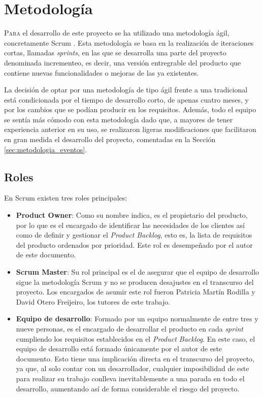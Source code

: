 \chapter{Metodología}
\label{chap:metodologia}

\lettrine{P}{ara} el desarrollo de este proyecto se ha utilizado una metodología ágil, concretamente Scrum \cite{scrum}.
Esta metodología se basa en la realización de iteraciones cortas, llamadas \textit{sprints}, en las que se desarrolla una parte del proyecto
denominada incrementeo, es decir, una versión entregrable del producto que contiene
nuevas funcionalidades o mejoras de las ya existentes.

\bigskip
La decisión de optar por una metodología de tipo ágil frente a una tradicional
está condicionada por el tiempo de desarrollo corto, de apenas cuatro meses, y por los cambios que se podían producir en los requisitos.
Además, todo el equipo se sentía más cómodo con esta metodología dado que, a mayores de tener experiencia anterior en su uso, se realizaron
ligeras modificaciones que facilitaron en gran medida el desarrollo del proyecto, comentadas en la Sección \ref{sec:metodologia_eventos}.

\section{Roles}
\label{sec:metodologia_roles}

En Scrum existen tres roles principales:

\begin{itemize}
	\item \textbf{Product Owner}: Como su nombre indica, es el propietario del producto, por lo que es el encargado de identificar
	      las necesidades de los clientes así como de definir y gestionar el \textit{Product Backlog}, esto es, la lista de requisitos del producto ordenados por prioridad.
	      Este rol es desempeñado por el autor de este documento.
	\item \textbf{Scrum Master}: Su rol principal es el de asegurar que el equipo de desarrollo sigue la metodología Scrum y no se producen
	      desajustes en el transcurso del proyecto. Los encargados de asumir este rol fueron Patricia Martín Rodilla y David Otero Freijeiro, los
	      tutores de este trabajo.
	\item \textbf{Equipo de desarrollo}: Formado por un equipo normalmente de entre tres y nueve personas, es el encargado de desarrollar el producto
	      en cada \textit{sprint} cumpliendo los requisitos establecidos en el \textit{Product Backlog}. En este caso, el equipo de desarrollo está
	      formado únicamente por el autor de este documento. Esto tiene una implicación directa en el transcurso del proyecto, ya que,
	      al solo contar con un desarrollador, cualquier imposibilidad de este para realizar su trabajo conlleva inevitablemente a una parada en todo el desarrollo,
	      aumentando así de forma considerable el riesgo del proyecto.
\end{itemize}

